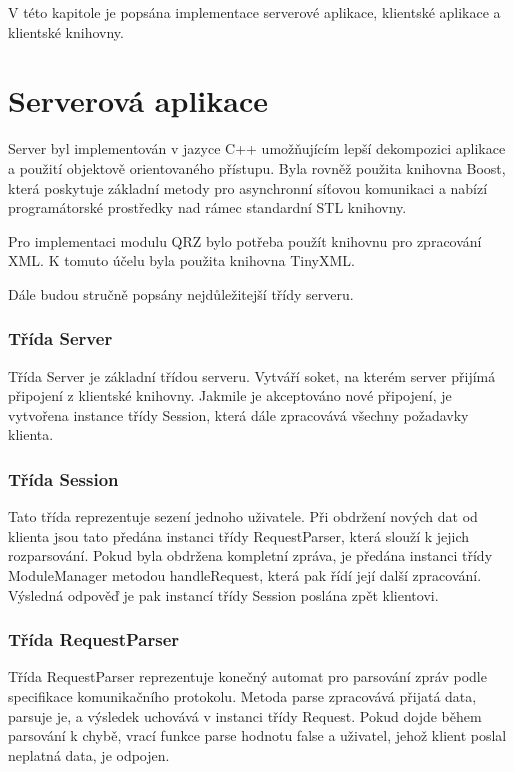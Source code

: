 V této kapitole je popsána implementace serverové aplikace, klientské aplikace a klientské knihovny.

\section{Serverová aplikace}
\label{implementace_server}

Server byl implementován v jazyce C++ umožňujícím lepší dekompozici aplikace a
použití objektově orientovaného přístupu. Byla rovněž
použita knihovna Boost, která poskytuje základní metody pro asynchronní síťovou komunikaci a nabízí programátorské prostředky
nad rámec standardní STL knihovny.

Pro implementaci modulu QRZ bylo potřeba použít knihovnu pro zpracování XML. K
tomuto účelu byla použita knihovna TinyXML.

Dále budou stručně popsány nejdůležitejší třídy serveru.

\subsubsection{Třída Server}

Třída Server je základní třídou serveru. Vytváří soket, na kterém server přijímá připojení z klientské knihovny. Jakmile je 
akceptováno nové připojení, je vytvořena instance třídy Session, která dále
zpracovává všechny požadavky klienta.

\subsubsection{Třída Session}

Tato třída reprezentuje sezení jednoho uživatele. Při obdržení nových dat od klienta jsou tato předána instanci třídy
RequestParser, která slouží k jejich rozparsování. Pokud byla obdržena kompletní zpráva, je předána instanci třídy 
ModuleManager metodou handleRequest, která pak řídí její další zpracování. Výsledná odpověď je pak instancí třídy Session poslána
zpět klientovi.

\subsubsection{Třída RequestParser}

Třída RequestParser reprezentuje konečný automat pro parsování zpráv podle specifikace komunikačního protokolu.
Metoda parse zpracovává přijatá data, parsuje je, a výsledek uchovává v instanci třídy Request. Pokud dojde během parsování
k chybě, vrací funkce parse hodnotu false a uživatel, jehož klient poslal
neplatná data, je odpojen.

